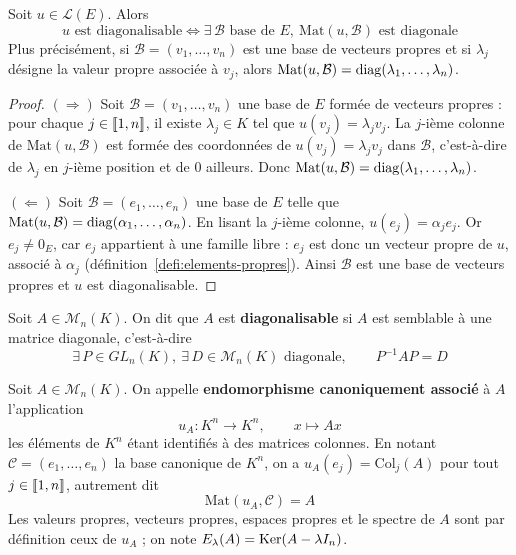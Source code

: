 \begin{prop}
\label{prop:diago-matrice-diagonale}
Soit $u\in\mathcal{L}(E)$. Alors
\[u \text{ est diagonalisable} \iff \exists\,\mathcal{B} \text{ base de } E,\ \mathrm{Mat}(u,\mathcal{B}) \text{ est diagonale}\]
Plus précisément, si $\mathcal{B}=(v_1,\dots,v_n)$ est une base de vecteurs propres et si $\lambda_j$ désigne la valeur propre associée à $v_j$, alors $\mathrm{Mat}(u,\mathcal{B})=\operatorname{diag}(\lambda_1,\dots,\lambda_n)$.
\end{prop}

\begin{proof}
$(\Rightarrow)$ Soit $\mathcal{B}=(v_1,\dots,v_n)$ une base de $E$ formée de vecteurs propres : pour chaque $j\in\llbracket 1,n \rrbracket$, il existe $\lambda_j\in K$ tel que $u(v_j)=\lambda_j v_j$. La $j$-ième colonne de $\mathrm{Mat}(u,\mathcal{B})$ est formée des coordonnées de $u(v_j)=\lambda_j v_j$ dans $\mathcal{B}$, c'est-à-dire de $\lambda_j$ en $j$-ième position et de $0$ ailleurs. Donc $\mathrm{Mat}(u,\mathcal{B})=\operatorname{diag}(\lambda_1,\dots,\lambda_n)$.

$(\Leftarrow)$ Soit $\mathcal{B}=(e_1,\dots,e_n)$ une base de $E$ telle que $\mathrm{Mat}(u,\mathcal{B})=\operatorname{diag}(\alpha_1,\dots,\alpha_n)$. En lisant la $j$-ième colonne, $u(e_j)=\alpha_j e_j$. Or $e_j\neq 0_E$, car $e_j$ appartient à une famille libre : $e_j$ est donc un vecteur propre de $u$, associé à $\alpha_j$ (définition~\ref{defi:elements-propres}). Ainsi $\mathcal{B}$ est une base de vecteurs propres et $u$ est diagonalisable.
\end{proof}

\begin{defi}
\label{defi:matrice-diagonalisable}
Soit $A\in\mathcal{M}_n(K)$. On dit que $A$ est \textbf{diagonalisable} si $A$ est semblable à une matrice diagonale, c'est-à-dire
\[\exists\, P\in GL_n(K),\ \exists\, D\in\mathcal{M}_n(K) \text{ diagonale},\qquad P^{-1}AP=D\]
\end{defi}

\begin{defi}
\label{defi:endo-canonique}
Soit $A\in\mathcal{M}_n(K)$. On appelle \textbf{endomorphisme canoniquement associé} à $A$ l'application
\[u_A : K^n\longrightarrow K^n, \qquad x\longmapsto Ax\]
les éléments de $K^n$ étant identifiés à des matrices colonnes. En notant $\mathcal{C}=(e_1,\dots,e_n)$ la base canonique de $K^n$, on a $u_A(e_j)=\mathrm{Col}_j(A)$ pour tout $j\in\llbracket 1,n \rrbracket$, autrement dit
\[\mathrm{Mat}(u_A,\mathcal{C}) = A\]
Les valeurs propres, vecteurs propres, espaces propres et le spectre de $A$ sont par définition ceux de $u_A$ ; on note $E_\lambda(A)=\operatorname{Ker}(A-\lambda I_n)$.
\end{defi}

